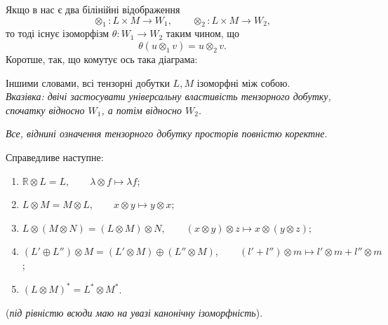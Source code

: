 \documentclass{math_library}
\begin{document}
\begin{corollary}
\label{tensor_products_are_isomorphic}
Якщо в нас є два білінійні відображення
\[
\otimes_1 \colon L \times M \to W_1, \qquad \otimes_2 \colon L \times M \to W_2,
\]
то тоді існує ізоморфізм $\theta \colon W_1 \to W_2$ таким чином, що \[
\theta(u \otimes_1 v) = u \otimes_2 v.
\]
Коротше, так, що комутує ось така діаграма:
\begin{figure}[H]
\centering
{}
\end{figure}
\noindent
Іншими словами, всі тензорні добутки $L,M$ ізоморфні між собою.\\
\textit{Вказівка: двічі застосувати універсальну властивість тензорного добутку, спочатку відносно $W_1$, а потім відносно $W_2$.}
\end{corollary}

\textit{Все, віднині означення тензорного добутку просторів повністю коректне}.

\begin{proposition}
Справедливе наступне:
\begin{enumerate}[nosep,wide=0pt,label={\arabic*)}]
\item $\mathbb{R} \otimes L = L, \qquad \lambda \otimes f \mapsto \lambda f$;
\item $L \otimes M = M \otimes L, \qquad x \otimes y \mapsto y \otimes x$;
\item $L \otimes (M \otimes N) = (L \otimes M) \otimes N, \qquad (x \otimes y) \otimes z \mapsto x \otimes (y \otimes z)$;
\item $(L' \oplus L'') \otimes M = (L' \otimes M) \oplus (L'' \otimes M), \qquad (l'+l'') \otimes m \mapsto l' \otimes m + l'' \otimes m$;
\item $(L \otimes M)^* = L^* \otimes M^*$.
\end{enumerate}
(\textit{під рівністю всюди маю на увазі канонічну ізоморфність}).
\end{proposition}
\end{document}
